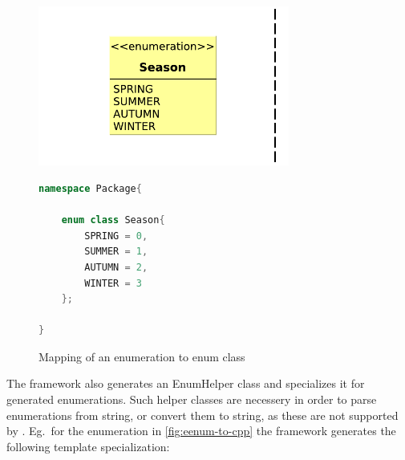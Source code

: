 \begin{figure}[H]
	\begin{center}
		
		\begin{minipage}[c]{\textwidth}
		\begin{minipage}[r]{0.52\textwidth}
			\hfill
			\includegraphics[width=0.735\textwidth]{figures/eenum-to-cpp.pdf}
		\end{minipage}
			\hspace{0.05\textwidth}
		\begin{minipage}[c]{0.25\textwidth}
\begin{lstlisting}[language=C++]
namespace Package{
	
	enum class Season{
		SPRING = 0,
		SUMMER = 1,
		AUTUMN = 2,
		WINTER = 3
	};

}
\end{lstlisting}			
		\end{minipage}
		\end{minipage}
		\caption{Mapping of an enumeration to \protect\cpp{} enum class }
		\label{fig:eenum-to-cpp}
	\end{center}
\end{figure}


The framework also generates an EnumHelper class and specializes it for generated enumerations. Such helper classes are necessery in order to  parse enumerations from string, or convert them to string, as these are not supported by \cpp{}. Eg.\ for the enumeration in \autoref{fig:eenum-to-cpp} the framework generates the following template specialization:

